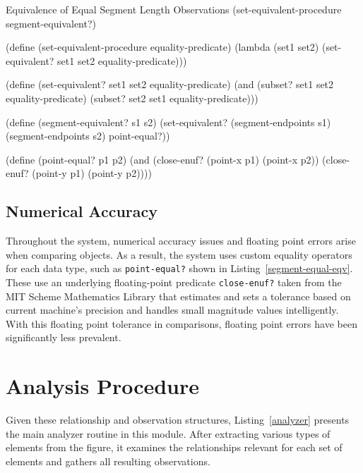 \begin{code-listing}
[label=segment-equal-eqv]
{Equivalence of Equal Segment Length Observations}
(set-equivalent-procedure segment-equivalent?)

(define (set-equivalent-procedure equality-predicate)
  (lambda (set1 set2)
    (set-equivalent? set1 set2 equality-predicate)))

(define (set-equivalent? set1 set2 equality-predicate)
  (and (subset? set1 set2 equality-predicate)
       (subset? set2 set1 equality-predicate)))

(define (segment-equivalent? s1 s2)
  (set-equivalent?
   (segment-endpoints s1)
   (segment-endpoints s2)
   point-equal?))

(define (point-equal? p1 p2)
  (and (close-enuf? (point-x p1) (point-x p2))
       (close-enuf? (point-y p1) (point-y p2))))
\end{code-listing}

\subsection{Numerical Accuracy}

Throughout the system, numerical accuracy issues and floating point
errors arise when comparing objects. As a result, the system uses
custom equality operators for each data type, such as
\texttt{point-equal?} shown in Listing~\ref{segment-equal-eqv}. These
use an underlying floating-point predicate \texttt{close-enuf?} taken
from the MIT Scheme Mathematics Library \cite{scmutils} that estimates
and sets a tolerance based on current machine's precision and handles
small magnitude values intelligently. With this floating point
tolerance in comparisons, floating point errors have been
significantly less prevalent.

\section{Analysis Procedure}

Given these relationship and observation structures,
Listing~\ref{analyzer} presents the main analyzer routine in this
module. After extracting various types of elements from the figure, it
examines the relationships relevant for each set of elements and
gathers all resulting observations.

